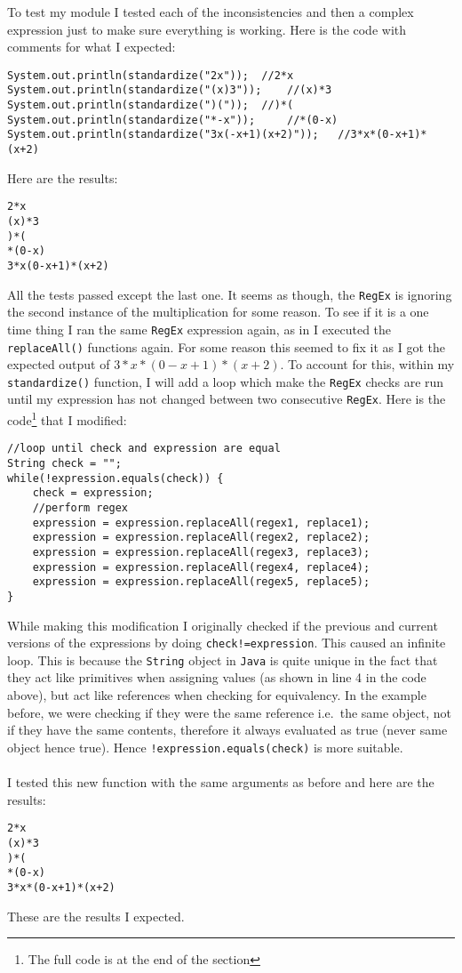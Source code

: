 \documentclass[../../../../main.tex]{subfiles}
\begin{document}
\newpage\noindent
To test my module I tested each of the inconsistencies and then a complex expression just to make sure everything is working. Here is the code with comments for what I expected:
\begin{verbatim}
System.out.println(standardize("2x"));	//2*x
System.out.println(standardize("(x)3"));	//(x)*3
System.out.println(standardize(")("));	//)*(
System.out.println(standardize("*-x"));		//*(0-x)
System.out.println(standardize("3x(-x+1)(x+2)"));	//3*x*(0-x+1)*(x+2)
\end{verbatim}
Here are the results:
\begin{verbatim}
2*x
(x)*3
)*(
*(0-x)
3*x(0-x+1)*(x+2)
\end{verbatim}
All the tests passed except the last one. It seems as though, the \texttt{RegEx} is ignoring the second instance of the multiplication for some reason. To see if it is a one time thing I ran the same \texttt{RegEx} expression again, as in I executed the \texttt{replaceAll()} functions again. For some reason this seemed to fix it as I got the expected output of $3*x*(0-x+1)*(x+2)$. To account for this, within my \texttt{standardize()} function, I will add a loop which make the \texttt{RegEx} checks are run until my expression has not changed between two consecutive \texttt{RegEx}. Here is the code\footnote{The full code is at the end of the section} that I modified:
\begin{verbatim}
//loop until check and expression are equal
String check = "";
while(!expression.equals(check)) {
	check = expression;
	//perform regex
	expression = expression.replaceAll(regex1, replace1);
	expression = expression.replaceAll(regex2, replace2);
	expression = expression.replaceAll(regex3, replace3);
	expression = expression.replaceAll(regex4, replace4);
	expression = expression.replaceAll(regex5, replace5);			
}
\end{verbatim}
While making this modification I originally checked if the previous and current versions of the expressions by doing \texttt{check!=expression}. This caused an infinite loop. This is because the \texttt{String} object in \texttt{Java} is quite unique in the fact that they act like primitives when assigning values (as shown in line 4 in the code above), but act like references when checking for equivalency\cite{javaString}. In the example before, we were checking if they were the same reference i.e.\ the same object, not if they have the same contents, therefore it always evaluated as true (never same object hence true). Hence \texttt{!expression.equals(check)} is more suitable.\\ \\
I tested this new function with the same arguments as before and here are the results:
\begin{verbatim}
2*x
(x)*3
)*(
*(0-x)
3*x*(0-x+1)*(x+2)
\end{verbatim}
These are the results I expected.
\newpage
\end{document}

